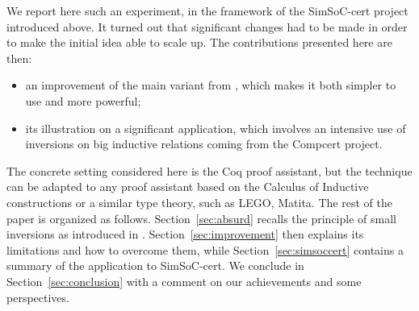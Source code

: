 We report here such an experiment, 
in the framework of the SimSoC-cert project introduced above.
It turned out that significant changes had to
be made in order to make the initial idea able
to scale up.
%
The contributions presented here are then:
\begin{itemize}
\item an improvement of the main variant from \cite{small_inv},
  which makes 
  it both simpler to use and more powerful;
\item its illustration on a significant application,
  which involves an intensive use of inversions on 
  big inductive relations coming from the Compcert project.
\end{itemize}

The concrete setting considered here is the Coq proof assistant,
but the technique can be adapted to any proof assistant based
on the Calculus of Inductive constructions or a similar type theory, 
such as LEGO, Matita. %
The rest of the paper is organized as follows.
Section~\ref{sec:absurd}
recalls the principle of small inversions as introduced in \cite{small_inv}.
Section~\ref{sec:improvement} then explains its limitations
and how to overcome them,
while Section~\ref{sec:simsoccert} contains a summary
of the application to SimSoC-cert.
We conclude in Section~\ref{sec:conclusion} with a comment
on our achievements and some perspectives.




